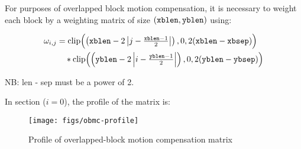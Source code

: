 
For purposes of overlapped block motion compensation, it is necessary to
weight each block by a weighting matrix of size $(\text{\texttt{xblen}},\text{\texttt{yblen}})$ using:

\providecommand{\abs}[1]{\left\lvert#1\right\rvert}
\begin{equation*}
\begin{split}
\omega_{i,j} &= \text{clip}\Bigl(\left( \xblen - 2\abs{j-\tfrac{\xblen-1}{2}} \right), 0, 2(\xblen-\xbsep)\Bigr) \\
        &\quad* \text{clip}\Bigl(\left( \yblen - 2\abs{i-\tfrac{\yblen-1}{2}} \right), 0, 2(\yblen-\ybsep)\Bigr)
\end{split}
\end{equation*}

NB: len - sep must be a power of 2.

In section ($i=0$), the profile of the matrix is:

\begin{figure}[h]
\centering
\texttt{[image: figs/obmc-profile]}
\caption{Profile of overlapped-block motion compensation matrix}
\label{fig:blockcoverage}
\end{figure}

